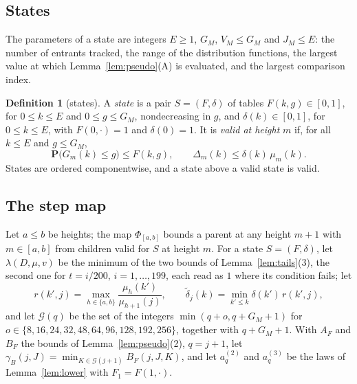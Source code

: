 \documentclass[11pt]{amsart}
\theoremstyle{definition}
\newtheorem{definition}[theorem]{Definition}
\numberwithin{equation}{section}
\newcommand{\lean}[1]{\ignorespaces}
\renewcommand{\P}{\mathbf{P}}
\begin{document}
\subsection*{States}
The parameters of a state are integers $E\ge1$, $G_M$, $V_M\le G_M$ and $J_M\le E$: the number of entrants tracked, the range of the distribution functions, the largest value at which Lemma~\ref{lem:pseudo}(A) is evaluated, and the largest comparison index.

\begin{definition}[states]\label{def:state}\lean{FrogModel.D3.Iface.StParams, FrogModel.D3.Iface.State, FrogModel.D3.Iface.State.WF, FrogModel.D3.Iface.State.Le, FrogModel.D3.Iface.Valid}
A \emph{state} is a pair $S=(F,\delta)$ of tables $F(k,g)\in[0,1]$, for $0\le k\le E$ and $0\le g\le G_M$, nondecreasing in $g$, and $\delta(k)\in[0,1]$, for $0\le k\le E$, with $F(0,\cdot)=1$ and $\delta(0)=1$. It is \emph{valid at height} $m$ if, for all $k\le E$ and $g\le G_M$,
\[
\P\bigl(G_m(k)\le g\bigr)\le F(k,g),\qquad\Delta_m(k)\le\delta(k)\,\mu_m(k). %
\]
States are ordered componentwise, and a state above a valid state is valid.
\end{definition}

\subsection*{The step map}
Let $a\le b$ be heights; the map $\Phi_{[a,b]}$ bounds a parent at any height $m+1$ with $m\in[a,b]$ from children valid for $S$ at height $m$. For a state $S=(F,\delta)$, let $\lambda(D,\mu,v)$ be the minimum of the two bounds of Lemma~\ref{lem:tails}(3), the second one for $t=i/200$, $i=1,\dots,199$, each read as $1$ where its condition fails; let
\[
r(k',j)=\max_{h\in\{a,b\}}\frac{\mu_h(k')}{\mu_{h+1}(j)},\qquad\widetilde\delta_j(k)=\min_{k'\le k}\delta(k')\,r(k',j),
\]
and let $\mathcal G(q)$ be the set of the integers $\min(q+o,q+G_M+1)$ for $o\in\{8,16,24,32,48,\allowbreak64,96,128,192,256\}$, together with $q+G_M+1$. With $A_F$ and $B_F$ the bounds of Lemma~\ref{lem:pseudo}(2), $q=j+1$, let $\gamma_B(j,J)=\min_{K\in\mathcal G(j+1)}B_F(j,J,K)$, and let $a^{(2)}_q$ and $a^{(3)}_q$ be the laws of Lemma~\ref{lem:lower} with $F_1=F(1,\cdot)$.
\end{document}

